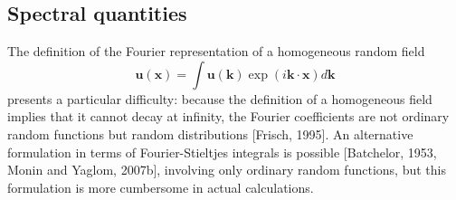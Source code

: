 \subsection{Spectral quantities}
The definition of the Fourier representation of a homogeneous random field 
\begin{equation}
    \mathbf{u}(\mathbf{x})=\int\mathbf{u}(\mathbf{k})\exp(i\mathbf{k}\cdot\mathbf{x})d\mathbf{k}
\end{equation}
presents a particular difficulty: because the definition of a homogeneous field implies that it cannot decay at infinity, the Fourier coefficients are not ordinary random functions but random distributions [Frisch, 1995].
An alternative formulation in terms of Fourier-Stieltjes integrals is possible [Batchelor, 1953, Monin and Yaglom, 2007b], involving only ordinary random functions, but this formulation is more cumbersome in actual calculations.

